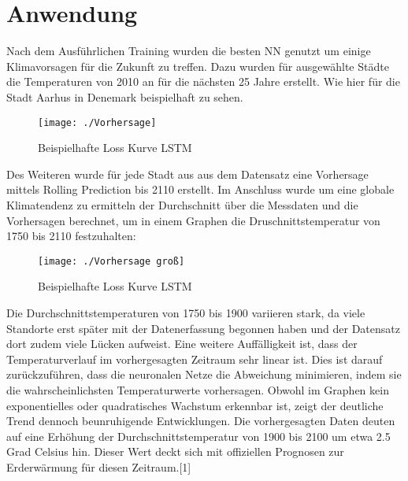 \documentclass[acmtog, authorversion]{acmart} %
\begin{document}
\section{Anwendung}
Nach dem Ausführlichen Training wurden die besten NN genutzt um einige Klimavorsagen für die Zukunft zu treffen. Dazu wurden für ausgewählte Städte die Temperaturen von 2010 an für die nächsten 25 Jahre erstellt. 
Wie hier für die Stadt Aarhus in Denemark beispielhaft zu sehen.
\begin{figure}[H]
    \centering
    \texttt{[image: ./Vorhersage]}
    \label{fig:sub7}
    \caption{Beispielhafte Loss Kurve LSTM}
\end{figure}
Des Weiteren wurde für jede Stadt aus aus dem Datensatz eine Vorhersage mittels Rolling Prediction bis 2110 erstellt. Im Anschluss wurde um eine globale Klimatendenz zu ermitteln der Durchschnitt über die Messdaten und die Vorhersagen berechnet, um in einem Graphen die Druschnittstemperatur von 1750 bis 2110 festzuhalten:
\begin{figure}[H]
    \centering
    \texttt{[image: ./Vorhersage groß]}
    \label{fig:sub7}
    \caption{Beispielhafte Loss Kurve LSTM}
\end{figure}
Die Durchschnittstemperaturen von 1750 bis 1900 variieren stark, da viele Standorte erst später mit der Datenerfassung begonnen haben und der Datensatz dort zudem viele Lücken aufweist. Eine weitere Auffälligkeit ist, dass der Temperaturverlauf im vorhergesagten Zeitraum sehr linear ist. Dies ist darauf zurückzuführen, dass die neuronalen Netze die Abweichung minimieren, indem sie die wahrscheinlichsten Temperaturwerte vorhersagen. Obwohl im Graphen kein exponentielles oder quadratisches Wachstum erkennbar ist, zeigt der deutliche Trend dennoch beunruhigende Entwicklungen. Die vorhergesagten Daten deuten auf eine Erhöhung der Durchschnittstemperatur von 1900 bis 2100 um etwa 2.5 Grad Celsius hin. Dieser Wert deckt sich mit offiziellen Prognosen zur Erderwärmung für diesen Zeitraum.[1]
\end{document}
